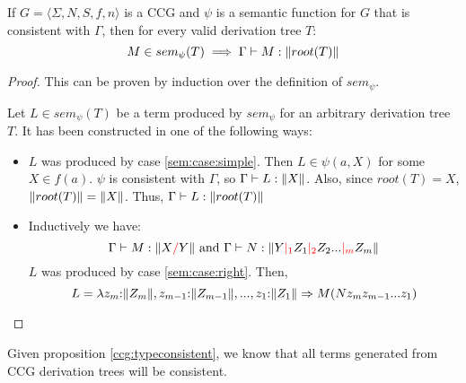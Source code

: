 \documentclass[main.tex]{subfiles}
\begin{document}
\begin{prop}
    \label{ccg:typeconsistent}
    If $ G = \langle \Sigma, N, S, f, n \rangle $ is a CCG and $\psi$ is a
    semantic function for $G$ that is consistent with $\Gamma$, then
    for every valid derivation tree $T$:
    \[
        M \in sem_{\psi}(T) \implies \Gamma \vdash M : \|root(T)\|
    \]
\end{prop}
\begin{proof}
    This can be proven by induction over the definition of $sem_{\psi}$.

    Let $L \in sem_{\psi}(T)$ be a term produced by $sem_{\psi}$ for an
    arbitrary derivation tree $T$. It has been constructed in one of the
    following ways:
    \begin{itemize}
        \item $L$ was produced by case \ref{sem:case:simple}. Then
            $L \in \psi(a, X)$ for some $X \in f(a)$. $\psi$
            is consistent with $\Gamma$, so $\Gamma \vdash L: \|X\|$. Also, since
            $root(T) = X$, $\|root(T)\| = \|X\|$. Thus,
            $\Gamma \vdash L: \|root(T)\|$
        \item Inductively we have:
            \[ \Gamma \vdash M : \|X \textcolor{red}{/} Y\| \text{ and }
               \Gamma \vdash N : \|Y \textcolor{red}{|_{1}} Z_1 \textcolor{red}{|_{2}} Z_2 ... \textcolor{red}{|_{m}} Z_m\| \]
            $L$ was produced by case \ref{sem:case:right}. Then,
            \[ L = \lambda z_m {:} \|Z_m\|, z_{m - 1} {:} \|Z_{m - 1}\|, ..., z_1 {:} \|Z_1\| \Rightarrow
            M ( N z_m z_{m - 1} ... z_1 ) \]
    \end{itemize}
\end{proof}

Given proposition \autoref{ccg:typeconsistent}, we know that all terms generated
from CCG derivation trees will be consistent.
\end{document}
